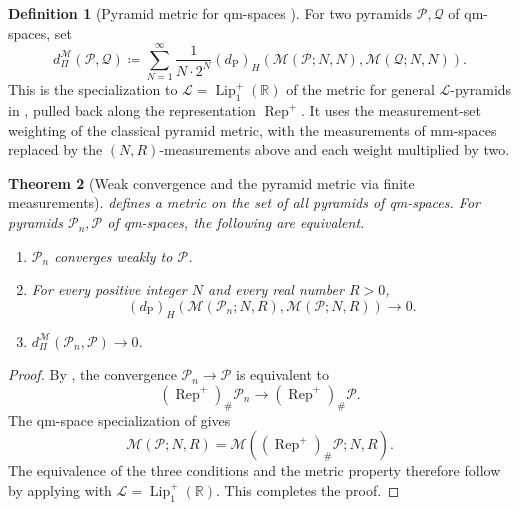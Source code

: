 \documentclass{amsart}
\theoremstyle{plain}
\newtheorem{theorem}{Theorem}[section]
\theoremstyle{definition}
\newtheorem{definition}[theorem]{Definition}
\theoremstyle{remark}
\newcommand{\R}{\mathbb{R}}
\newcommand{\M}{\mathcal{M}}
\renewcommand{\L}{\mathcal{L}}
\newcommand{\Lup}{\operatorname{Lip}^{+}_{1}(\R)}
\newcommand{\dpr}{d_{\operatorname{P}}}
\newcommand{\haus}[1]{\left(#1\right)_H}
\begin{document}
\begin{definition}[Pyramid metric for qm-spaces {\cite[Definition~6.17 and Theorem~6.18]{shioya2024sgc}}]
\label{def:measurement-pyramid-metric}
For two pyramids $\mathcal P,\mathcal Q$ of qm-spaces, set
\begin{equation}
\label{eq:measurement-pyramid-metric}
d_{\Pi}^{\M}(\mathcal P,\mathcal Q)
\coloneqq\sum_{N=1}^{\infty}\frac{1}{N\cdot2^N}
\haus{\dpr}\left(
\M(\mathcal P;N,N),
\M(\mathcal Q;N,N)
\right).
\end{equation}
This is the specialization to $\L=\Lup$ of the metric for general $\L$-pyramids in , pulled back along the representation $\operatorname{Rep}^{+}$. It uses the measurement-set weighting of the classical pyramid metric, with the measurements of mm-spaces replaced by the $(N,R)$-measurements above and each weight multiplied by two.
\end{definition}

\begin{theorem}[Weak convergence and the pyramid metric via finite measurements]
\label{thm:pyramid-ordered-measurement-criterion}
\label{thm:measurement-pyramid-metric}
 defines a metric on the set of all pyramids of qm-spaces. For pyramids $\mathcal P_n,\mathcal P$ of qm-spaces, the following are equivalent.
\begin{enumerate}[label=\textup{(\roman*)}]
\item $\mathcal P_n$ converges weakly to $\mathcal P$.
\item For every positive integer $N$ and every real number $R>0$,
\[\haus{\dpr}(\M(\mathcal P_n;N,R),\M(\mathcal P;N,R))\longrightarrow0.\]
\item $d_{\Pi}^{\M}(\mathcal P_n,\mathcal P)\to0$.
\end{enumerate}
\end{theorem}

\begin{proof}
By , the convergence $\mathcal P_n\to\mathcal P$ is equivalent to
\[(\operatorname{Rep}^{+})_{\#}\mathcal P_n\longrightarrow(\operatorname{Rep}^{+})_{\#}\mathcal P.\]
The qm-space specialization of  gives
\[\M(\mathcal P;N,R)=\M((\operatorname{Rep}^{+})_{\#}\mathcal P;N,R).\]
The equivalence of the three conditions and the metric property therefore follow by applying  with $\L=\Lup$.
This completes the proof.
\end{proof}
\end{document}
